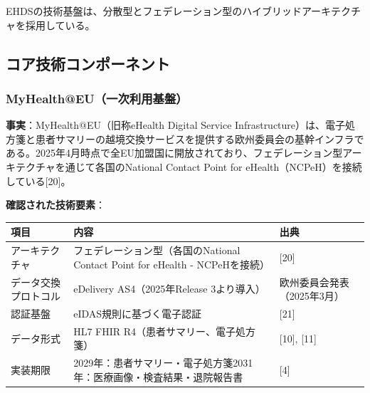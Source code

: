 \documentclass[
  a4paper,
  a4paper,
  11pt]{ltjsbook}
\begin{document}
EHDSの技術基盤は、分散型とフェデレーション型のハイブリッドアーキテクチャを採用している。

\subsection{コア技術コンポーネント}\label{ux30b3ux30a2ux6280ux8853ux30b3ux30f3ux30ddux30fcux30cdux30f3ux30c8}

\subsubsection{MyHealth@EU（一次利用基盤）}\label{myhealtheuux4e00ux6b21ux5229ux7528ux57faux76e4}

\textbf{事実}：MyHealth@EU（旧称eHealth Digital Service
Infrastructure）は、電子処方箋と患者サマリーの越境交換サービスを提供する欧州委員会の基幹インフラである。2025年4月時点で全EU加盟国に開放されており、フェデレーション型アーキテクチャを通じて各国のNational
Contact Point for eHealth（NCPeH）を接続している{[}20{]}。

\textbf{確認された技術要素}：

\begin{longtable}[]{@{}
  >{\raggedright\arraybackslash}p{}
  >{\raggedright\arraybackslash}p{}
  >{\raggedright\arraybackslash}p{}@{}}
\toprule\noalign{}
\begin{minipage}[b]{\linewidth}\raggedright
項目
\end{minipage} & \begin{minipage}[b]{\linewidth}\raggedright
内容
\end{minipage} & \begin{minipage}[b]{\linewidth}\raggedright
出典
\end{minipage} \\
\midrule\noalign{}
\endhead
\bottomrule\noalign{}
\endlastfoot
アーキテクチャ & フェデレーション型（各国のNational Contact Point for
eHealth - NCPeHを接続） & {[}20{]} \\
データ交換プロトコル & eDelivery AS4（2025年Release 3より導入） &
欧州委員会発表（2025年3月） \\
認証基盤 & eIDAS規則に基づく電子認証 & {[}21{]} \\
データ形式 & HL7 FHIR R4（患者サマリー、電子処方箋） & {[}10{]},
{[}11{]} \\
実装期限 &
2029年：患者サマリー・電子処方箋2031年：医療画像・検査結果・退院報告書 &
{[}4{]} \\
\end{longtable}
\end{document}
